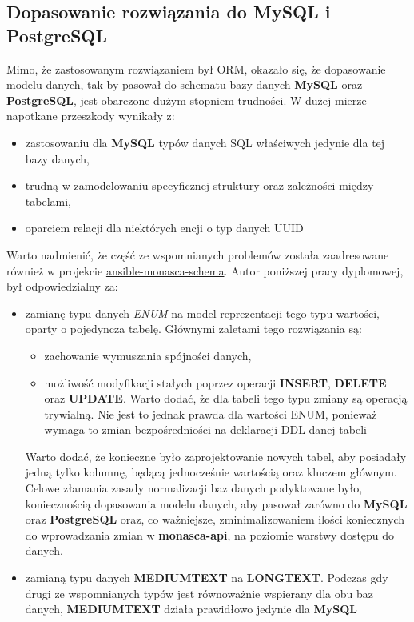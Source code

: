     \subsection{Dopasowanie rozwiązania do MySQL i PostgreSQL}
    Mimo, że zastosowanym rozwiązaniem był ORM, okazało się, że dopasowanie modelu danych, tak by pasował do 
    schematu bazy danych \textbf{MySQL} oraz \textbf{PostgreSQL}, jest obarczone dużym stopniem trudności. 
    W dużej mierze napotkane przeszkody wynikały z:
    \begin{itemize}
        \item zastosowaniu dla \textbf{MySQL} typów danych SQL właściwych jedynie dla tej bazy danych,
        \item trudną w zamodelowaniu specyficznej struktury oraz zależności między tabelami,
        \item oparciem relacji dla niektórych encji o typ danych UUID
    \end{itemize}
    
    Warto nadmienić, że część ze wspomnianych problemów została zaadresowane również
    w projekcie \href{https://github.com/FujitsuEnablingSoftwareTechnologyGmbH/ansible-monasca-schema}{ansible-monasca-schema}.
    Autor poniższej pracy dyplomowej, był odpowiedzialny za:
    \begin{itemize}
        \item zamianę typu danych \textit{ENUM} na model reprezentacji tego typu wartości, oparty
        o pojedyncza tabelę. Głównymi zaletami tego rozwiązania są:
        \begin{itemize}
            \item zachowanie wymuszania spójności danych,
            \item możliwość modyfikacji stałych poprzez operacji \textbf{INSERT}, \textbf{DELETE} oraz \textbf{UPDATE}. Warto
            dodać, że dla tabeli tego typu zmiany są operacją trywialną. Nie jest to jednak prawda dla wartości ENUM, ponieważ
            wymaga to zmian bezpośredniości na deklaracji DDL danej tabeli
        \end{itemize}
        Warto dodać, że konieczne było zaprojektowanie nowych tabel, aby posiadały jedną tylko kolumnę, będącą jednocześnie
        wartością oraz kluczem głównym. Celowe złamania zasady normalizacji baz danych podyktowane było, koniecznością
        dopasowania modelu danych, aby pasował zarówno do \textbf{MySQL} oraz \textbf{PostgreSQL} oraz, co ważniejsze,
        zminimalizowaniem ilości koniecznych do wprowadzania zmian w \textbf{monasca-api}, na poziomie warstwy dostępu do danych.
        \item zamianą typu danych \textbf{MEDIUMTEXT} na \textbf{LONGTEXT}. Podczas gdy drugi ze wspomnianych typów jest równoważnie
        wspierany dla obu baz danych, \textbf{MEDIUMTEXT} działa prawidłowo jedynie dla \textbf{MySQL}
    \end{itemize}
    
